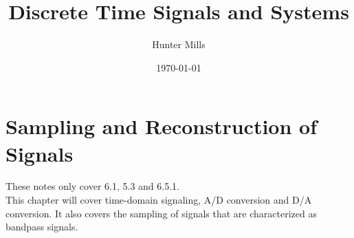 \documentclass{article} %
\title{Discrete Time Signals and Systems} %
\author{Hunter Mills} %
\date{\today} %
\begin{document}
    \maketitle %
    
    \section{Sampling and Reconstruction of Signals} %
    These notes only cover 6.1, 5.3 and 6.5.1.\\
    
    This chapter will cover time-domain signaling, A/D conversion and D/A conversion. It also covers the sampling of signals that are characterized as bandpass signals. 
    
\end{document}
